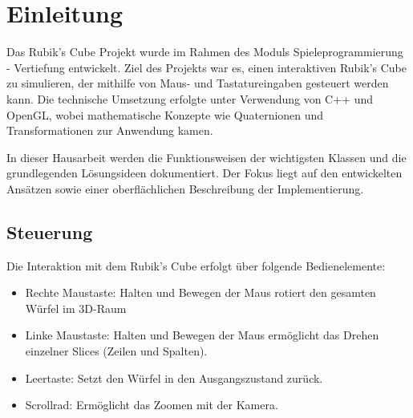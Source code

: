 \chapter{Einleitung}
Das Rubik’s Cube Projekt wurde im Rahmen des Moduls Spieleprogrammierung - Vertiefung entwickelt. Ziel des Projekts war es, einen interaktiven Rubik’s Cube zu simulieren, der mithilfe von Maus- und Tastatureingaben gesteuert werden kann. Die technische Umsetzung erfolgte unter Verwendung von C++ und OpenGL, wobei mathematische Konzepte wie Quaternionen und Transformationen zur Anwendung kamen.

In dieser Hausarbeit werden die Funktionsweisen der wichtigsten Klassen und die grundlegenden Lösungsideen dokumentiert. Der Fokus liegt auf den entwickelten Ansätzen sowie einer oberflächlichen Beschreibung der Implementierung.

\section{Steuerung}
Die Interaktion mit dem Rubik’s Cube erfolgt über folgende Bedienelemente:

\begin{itemize}
    \item Rechte Maustaste: Halten und Bewegen der Maus rotiert den gesamten Würfel im 3D-Raum
    \item Linke Maustaste: Halten und Bewegen der Maus ermöglicht das Drehen einzelner Slices (Zeilen und Spalten).
    \item Leertaste: Setzt den Würfel in den Ausgangszustand zurück.
    \item Scrollrad: Ermöglicht das Zoomen mit der Kamera.
\end{itemize}
